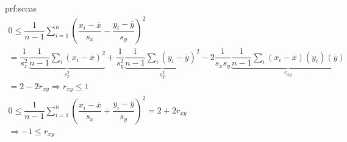 \newpage
\begin{prf}{prf:sccas}
  \begin{equation*}
    \begin{gathered}
      0\leq \dfrac{1}{n-1}\sum_{i=1}^{n}\left(\dfrac{x_i-\overline{x}}{s_x}-\dfrac{y_i-\overline{y}}{s_y}\right)^2\\
      = \dfrac{1}{s_x^2}\underbrace{\dfrac{1}{n-1}\sum_{i}\left(x_i-\overline{x}\right)^2}_{\text{$s_x^2$}}+\dfrac{1}{s_y^2}\underbrace{\dfrac{1}{n-1}\sum_{i}(y_i-\overline{y})^2}_{\text{$s_y^2$}}-2\dfrac{1}{s_xs_y}\underbrace{\dfrac{1}{n-1}\sum_{i}(x_i-\overline{x})(y_i)(\overline{y})}_{\text{$c_{xy}$}}\\
      = 2-2r_{xy}\Rightarrow r_{xy}\leq1\\
      0\leq\dfrac{1}{n-1}\sum_{i=1}^{n}\left(\dfrac{x_i-\overline{x}}{s_x}+\dfrac{y_i-\overline{y}}{s_y}\right)^2 = 2+2r_{xy}\\
      \Rightarrow -1\leq r_{xy}
    \end{gathered}
  \end{equation*}
\end{prf}
